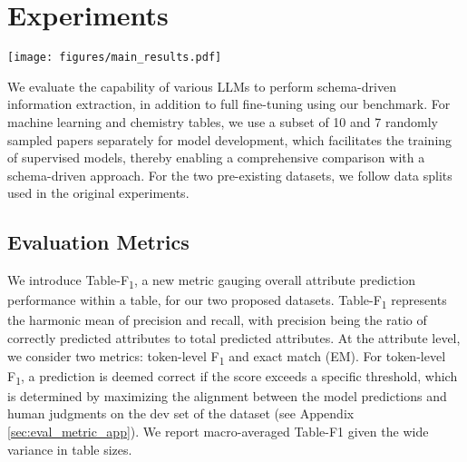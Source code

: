\documentclass[11pt]{article}
\newcommand\task{\textsc{Schema-to-Json}}
\newcommand\data{\textsc{MlTables}}
\newcommand{\chemtables}{\textsc{ChemTables}}
\newcommand{\discomat}{\textsc{DisCoMat}}
\begin{document}
\section{Experiments}
\label{sec:exp}











\begin{figure*}[ht!]
    \centering
    \texttt{[image: figures/main\_results.pdf]}
    \caption{Capability of various LLMs to perform Schema-Driven IE, measured using the \task{} benchmark. 
As noted in Section \ref{sec:eval_metric}, Table-F\textsubscript{1} is employed for \data{} and \chemtables{}, while Tuple-F\textsubscript{1} is used for \discomat{}. For SWDE, we report Page-F\textsubscript{1}, and  represents the number of websites used in training from each vertical. The *GPT-4 result on SWDE is computed on a 1,600 webpage sample due to API budget limitations - see Section \ref{sec:eval} and Footnote \ref{footnote:bootstrap}.
}
    \label{fig:main_results}
\end{figure*}


We evaluate the capability of various LLMs to perform schema-driven information extraction, in addition to full fine-tuning using our benchmark.
For machine learning and chemistry tables, we use a subset of 10 and 7 randomly sampled papers separately for model development, which facilitates the training of supervised models, thereby enabling a comprehensive comparison with a schema-driven approach. For the two pre-existing datasets, we follow data splits used in the original experiments.

\subsection{Evaluation Metrics}
\label{sec:eval_metric}
We introduce Table-F\textsubscript{1}, a new metric gauging overall attribute prediction performance within a table, for our two proposed datasets. Table-F\textsubscript{1} represents the harmonic mean of precision and recall, with precision being the ratio of
correctly predicted attributes to total predicted attributes.
At the attribute level, we consider two metrics: token-level F\textsubscript{1} and exact match (EM). For token-level F\textsubscript{1}, a prediction is deemed correct if the score exceeds a specific threshold, which is determined by maximizing the alignment between the model predictions and human judgments on the dev set of the dataset (see Appendix \ref{sec:eval_metric_app}). 
We report macro-averaged Table-F1 given the wide variance in table sizes.
\end{document}
